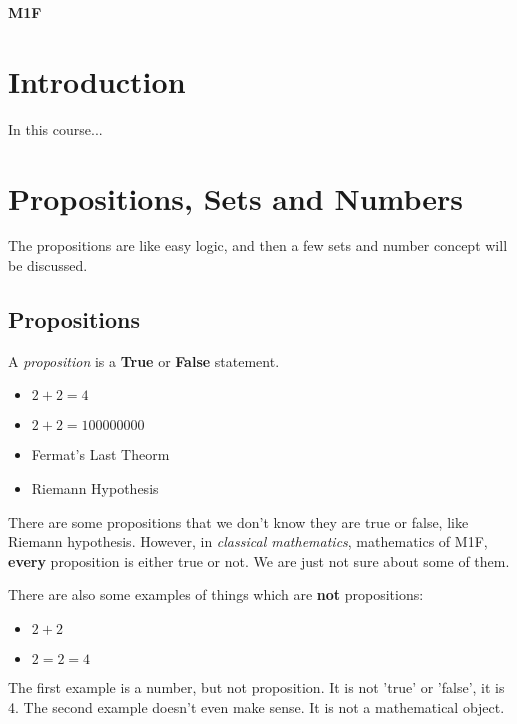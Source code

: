 \documentclass[a4paper]{article}
\begin{document}
\maketitle
{\small
  \noindent\textbf{M1F}\\
}

\tableofcontents

\setcounter{section}{-1}

\section{Introduction}
In this course...

\section{Propositions, Sets and Numbers}
The propositions are like easy logic, and then a few sets and number concept will be discussed.

\subsection{Propositions}
\begin{defi}[Proposition]
	A \emph{proposition} is a \textbf{True} or \textbf{False} statement.
\end{defi}

\begin{eg}\leavevmode
	\begin{itemize}
		\item $2 + 2 = 4$
		\item $2 + 2 = 100000000$
		\item Fermat's Last Theorm
		\item Riemann Hypothesis
	\end{itemize}
\end{eg}

There are some propositions that we don't know they are true or false, like Riemann hypothesis. However, in \emph{classical mathematics}, mathematics of M1F, \textbf{every} proposition is either true or not. We are just not sure about some of them.

There are also some examples of things which are \textbf{not} propositions:

\begin{eg}\leavevmode
	\begin{itemize}
		\item $2 + 2$
		\item $2 = 2 = 4$
	\end{itemize}
	The first example is a number, but not proposition. It is not 'true' or 'false', it is 4.
	The second example doesn't even make sense. It is not a mathematical object.
\end{eg}
\end{document}
